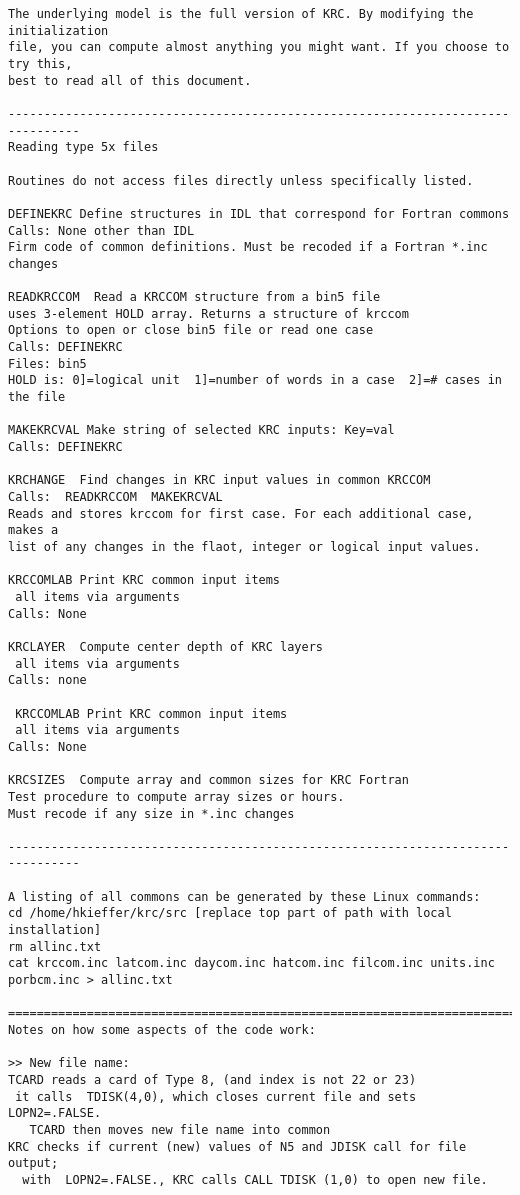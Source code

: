 \begin{verbatim}
The underlying model is the full version of KRC. By modifying the initialization
file, you can compute almost anything you might want. If you choose to try this,
best to read all of this document.

--------------------------------------------------------------------------------
Reading type 5x files

Routines do not access files directly unless specifically listed.

DEFINEKRC Define structures in IDL that correspond for Fortran commons
Calls: None other than IDL
Firm code of common definitions. Must be recoded if a Fortran *.inc changes

READKRCCOM  Read a KRCCOM structure from a bin5 file
uses 3-element HOLD array. Returns a structure of krccom
Options to open or close bin5 file or read one case 
Calls: DEFINEKRC
Files: bin5
HOLD is: 0]=logical unit  1]=number of words in a case  2]=# cases in the file 

MAKEKRCVAL Make string of selected KRC inputs: Key=val
Calls: DEFINEKRC

KRCHANGE  Find changes in KRC input values in common KRCCOM
Calls:  READKRCCOM  MAKEKRCVAL
Reads and stores krccom for first case. For each additional case, makes a 
list of any changes in the flaot, integer or logical input values. 

KRCCOMLAB Print KRC common input items
 all items via arguments
Calls: None

KRCLAYER  Compute center depth of KRC layers
 all items via arguments
Calls: none

 KRCCOMLAB Print KRC common input items
 all items via arguments
Calls: None

KRCSIZES  Compute array and common sizes for KRC Fortran
Test procedure to compute array sizes or hours.
Must recode if any size in *.inc changes

--------------------------------------------------------------------------------

A listing of all commons can be generated by these Linux commands:
cd /home/hkieffer/krc/src [replace top part of path with local installation]
rm allinc.txt
cat krccom.inc latcom.inc daycom.inc hatcom.inc filcom.inc units.inc porbcm.inc > allinc.txt 

==============================================================================
Notes on how some aspects of the code work:

>> New file name: 
TCARD reads a card of Type 8, (and index is not 22 or 23)
 it calls  TDISK(4,0), which closes current file and sets  LOPN2=.FALSE.
   TCARD then moves new file name into common 
KRC checks if current (new) values of N5 and JDISK call for file output;
  with  LOPN2=.FALSE., KRC calls CALL TDISK (1,0) to open new file.


\end{verbatim}
